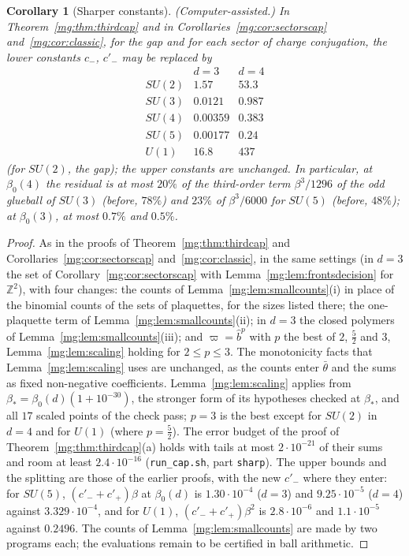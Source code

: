 \documentclass[11pt,a4paper]{article}
\newtheorem{corollary}[theorem]{Corollary}
\theoremstyle{definition}
\theoremstyle{remark}
\newcommand{\Z}{\mathbb{Z}}
\begin{document}
\begin{corollary}[Sharper constants]\label{mg:cor:sharp}
(Computer-assisted.) In Theorem~\ref{mg:thm:thirdcap} and in Corollaries~\ref{mg:cor:sectorscap} and~\ref{mg:cor:classic}, for the gap and for each sector of charge
conjugation, the lower constants $c_-$, $c'_-$ may be replaced by
\[
\begin{array}{lcc}
 & d=3 & d=4\\
SU(2) & 1.57 & 53.3\\
SU(3) & 0.0121 & 0.987\\
SU(4) & 0.00359 & 0.383\\
SU(5) & 0.00177 & 0.24\\
U(1) & 16.8 & 437
\end{array}
\]
(for $SU(2)$, the gap); the upper constants are unchanged. In particular, at $\beta_0(4)$ the residual is at most $20\%$ of the third-order term $\beta^3/1296$ of the odd
glueball of $SU(3)$ (before, $78\%$) and $23\%$ of $\beta^3/6000$ for $SU(5)$ (before, $48\%$); at $\beta_0(3)$, at most $0.7\%$ and $0.5\%$.
\end{corollary}

\begin{proof}
As in the proofs of Theorem~\ref{mg:thm:thirdcap} and Corollaries~\ref{mg:cor:sectorscap} and~\ref{mg:cor:classic}, in the same settings (in $d=3$ the set of
Corollary~\ref{mg:cor:sectorscap} with Lemma~\ref{mg:lem:frontsdecision} for $\Z^2$), with four changes: the counts of Lemma~\ref{mg:lem:smallcounts}(i) in place of the
binomial counts of the sets of plaquettes, for the sizes listed there; the one-plaquette term of Lemma~\ref{mg:lem:smallcounts}(ii); in $d=3$ the closed polymers of
Lemma~\ref{mg:lem:smallcounts}(iii); and $\varpi=\hat b^p$ with $p$ the best of $2$, $\frac52$ and $3$, Lemma~\ref{mg:lem:scaling} holding for $2\le p\le3$. The monotonicity
facts that Lemma~\ref{mg:lem:scaling} uses are unchanged, as the counts enter $\bar\theta$ and the sums as fixed non-negative coefficients. Lemma~\ref{mg:lem:scaling} applies from $\beta_*=\beta_0(d)(1+10^{-30})$, the stronger form of
its hypotheses checked at $\beta_*$, and all $17$ scaled points of the check pass; $p=3$ is the best except for $SU(2)$ in $d=4$ and for $U(1)$ (where $p=\frac52$). The error budget of
the proof of Theorem~\ref{mg:thm:thirdcap}(a) holds with tails at most $2\cdot10^{-21}$ of their sums and room at least $2.4\cdot10^{-16}$ (\texttt{run\_cap.sh}, part \texttt{sharp}). The upper
bounds and the splitting are those of the earlier proofs, with the new $c'_-$ where they enter: for $SU(5)$, $(c'_-+c'_+)\beta$ at $\beta_0(d)$ is $1.30\cdot10^{-4}$ ($d=3$) and $9.25\cdot10^{-5}$ ($d=4$) against
$3.329\cdot10^{-4}$, and for $U(1)$, $(c'_-+c'_+)\beta^2$ is $2.8\cdot10^{-6}$ and $1.1\cdot10^{-5}$ against $0.2496$. The counts of
Lemma~\ref{mg:lem:smallcounts} are made by two programs each; the evaluations remain to be certified in ball arithmetic.
\end{proof}
\end{document}
